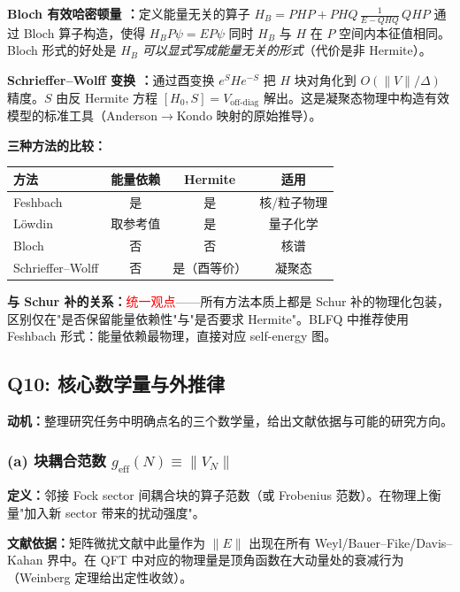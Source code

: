 \documentclass{article}
\begin{document}
\textbf{Bloch 有效哈密顿量 \cite{Bloch_Dalton_1957}：}定义能量无关的算子 $H_{B}=PHP+PHQ\,\frac{1}{E-QHQ}\,QHP$ 通过 Bloch 算子构造，使得 $H_{B}P\psi=E P\psi$ 同时 $H_{B}$ 与 $H$ 在 $P$ 空间内本征值相同。Bloch 形式的好处是 $H_{B}$ \emph{可以显式写成能量无关的形式}（代价是非 Hermite）。

\textbf{Schrieffer--Wolff 变换 \cite{Schrieffer_Wolff_1966,Bravyi_2011_SchriefferWolff}：}通过酉变换 $e^{S}He^{-S}$ 把 $H$ 块对角化到 $O(\|V\|/\Delta)$ 精度。$S$ 由反 Hermite 方程 $[H_{0},S]=V_{\text{off-diag}}$ 解出。这是凝聚态物理中构造有效模型的标准工具（Anderson$\to$Kondo 映射的原始推导）。

\textbf{三种方法的比较：}
\begin{center}
\begin{tabular}{lccc}
\hline
方法 & 能量依赖 & Hermite & 适用 \\
\hline
Feshbach & 是 & 是 & 核/粒子物理 \\
L\"owdin & 取参考值 & 是 & 量子化学 \\
Bloch & 否 & 否 & 核谱 \\
Schrieffer--Wolff & 否 & 是（酉等价） & 凝聚态 \\
\hline
\end{tabular}
\end{center}

\textbf{与 Schur 补的关系：}\textcolor{red}{统一观点}——所有方法本质上都是 Schur 补的物理化包装，区别仅在"是否保留能量依赖性"与"是否要求 Hermite"。BLFQ 中推荐使用 Feshbach 形式：能量依赖最物理，直接对应 self-energy 图。

\subsection{Q10: 核心数学量与外推律}

\textbf{动机：}整理研究任务中明确点名的三个数学量，给出文献依据与可能的研究方向。

\subsubsection*{(a) 块耦合范数 $g_{\mathrm{eff}}(N)\equiv\|V_{N}\|$}

\textbf{定义：}邻接 Fock sector 间耦合块的算子范数（或 Frobenius 范数）。在物理上衡量"加入新 sector 带来的扰动强度"。

\textbf{文献依据：}矩阵微扰文献中此量作为 $\|E\|$ 出现在所有 Weyl/Bauer--Fike/Davis--Kahan 界中。在 QFT 中对应的物理量是顶角函数在大动量处的衰减行为（Weinberg 定理给出定性收敛）。
\end{document}
